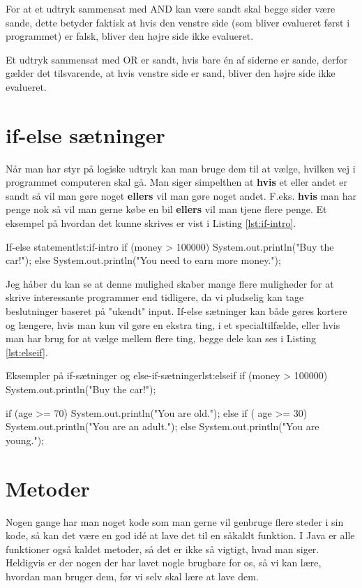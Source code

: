 {\begin{remark}
	For at et udtryk sammensat med AND kan være sandt skal begge sider være sande, dette betyder faktisk at hvis den venstre side (som bliver evalueret først i programmet) er falsk, bliver den højre side ikke evalueret.
	
	Et udtryk sammensat med OR er sandt, hvis bare én af siderne er sande, derfor gælder det tilsvarende, at hvis venstre side er sand, bliver den højre side ikke evalueret.
\end{remark}

\section{if-else sætninger}
Når man har styr på logiske udtryk kan man bruge dem til at vælge, hvilken vej i programmet computeren skal gå. Man siger simpelthen at \textbf{hvis} et eller andet er sandt så vil man gøre noget \textbf{ellers} vil man gøre noget andet. F.eks. \textbf{hvis} man har penge nok så vil man gerne købe en bil \textbf{ellers} vil man tjene flere penge. Et eksempel på hvordan det kunne skrives er vist i Listing \ref{lst:if-intro}.

\begin{JavaCode}{If-else statement}{lst:if-intro}
	if (money > 100000) {
		System.out.println("Buy the car!");
	} else {
		System.out.println("You need to earn more money.");
	}
\end{JavaCode}

Jeg håber du kan se at denne mulighed skaber mange flere muligheder for at skrive interessante programmer end tidligere, da vi pludselig kan tage beslutninger baseret på "ukendt" input. If-else sætninger kan både gøres kortere og længere, hvis man kun vil gøre en ekstra ting, i et specialtilfælde, eller hvis man har brug for at vælge mellem flere ting, begge dele kan ses i Listing \ref{lst:elseif}.

\begin{JavaCode}{Eksempler på if-sætninger og else-if-sætninger}{lst:elseif}
	if (money > 100000) {
		System.out.println("Buy the car!");
	}
	
	if (age >= 70) {
		System.out.println("You are old.");
	} else if ( age >= 30) {
		System.out.println("You are an adult.");
	} else {
		System.out.println("You are young.");
	}
\end{JavaCode}

\section{Metoder}
Nogen gange har man noget kode som man gerne vil genbruge flere steder i sin kode, så kan det være en god idé at lave det til en såkaldt funktion. I Java er alle funktioner også kaldet metoder, så det er ikke så vigtigt, hvad man siger. Heldigvis er der nogen der har lavet nogle brugbare for os, så vi kan lære, hvordan man bruger dem, før vi selv skal lære at lave dem. 

}
